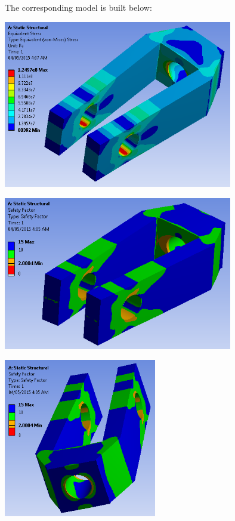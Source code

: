 \documentclass[a4paper,14pt]{extarticle}
\begin{document}
The corresponding model is built below:

\begin{center}\includegraphics[width=0.75\textwidth]{EX_3.PNG}\end{center}

\begin{center}\includegraphics[width=0.75\textwidth]{EX_2.PNG}\end{center}

\begin{center}\includegraphics[width=0.5\textwidth]{EX_1.PNG}\end{center}
\end{document}
